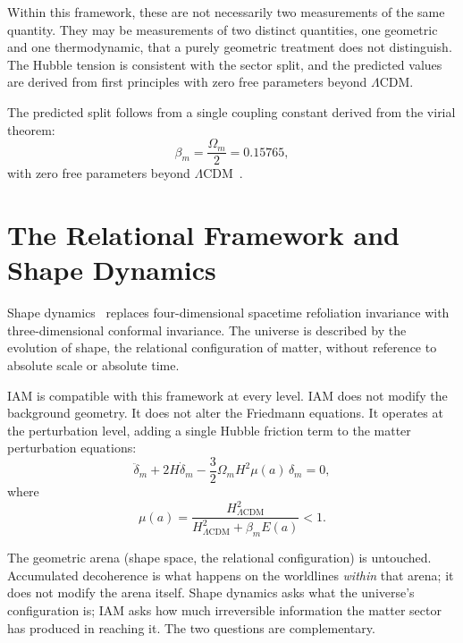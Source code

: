 \documentclass[12pt,a4paper]{article}
\begin{document}
Within this framework, these are not necessarily two measurements of the
same quantity. They may be measurements of two distinct quantities,
one geometric and one thermodynamic, that a purely geometric treatment
does not distinguish. The Hubble tension is consistent with the sector
split, and the predicted values are derived from first principles with
zero free parameters beyond $\Lambda$CDM.

The predicted split follows from a single coupling constant derived from
the virial theorem:
\begin{equation}
\beta_m = \frac{\Omega_m}{2} = 0.15765,
\label{eq:betam}
\end{equation}
with zero free parameters beyond $\Lambda$CDM~\citep{mahaffey2026}.

\section{The Relational Framework and Shape Dynamics}
\label{sec:shapedynamics}

Shape dynamics~\citep{Barbour2011,BarbourKoslowskiMercati2014} replaces
four-dimensional spacetime refoliation invariance with three-dimensional
conformal invariance. The universe is described by the evolution of shape,  the relational configuration of matter, without reference to
absolute scale or absolute time.

IAM is compatible with this framework at every level. IAM does not modify
the background geometry. It does not alter the Friedmann equations. It
operates at the perturbation level, adding a single Hubble friction term
to the matter perturbation equations:
\begin{equation}
\ddot{\delta}_m + 2H\dot{\delta}_m - \frac{3}{2}\Omega_m H^2 \mu(a)\,\delta_m = 0,
\end{equation}
where
\begin{equation}
\mu(a) = \frac{H^2_{\Lambda\text{CDM}}}{H^2_{\Lambda\text{CDM}} + \beta_m E(a)} < 1.
\end{equation}

The geometric arena (shape space, the relational configuration) is untouched.
Accumulated decoherence is what happens on the worldlines \textit{within} that
arena; it does not modify the arena itself. Shape dynamics asks what the
universe's configuration is; IAM asks how much irreversible information the matter
sector has produced in reaching it. The two questions are complementary.
\end{document}
